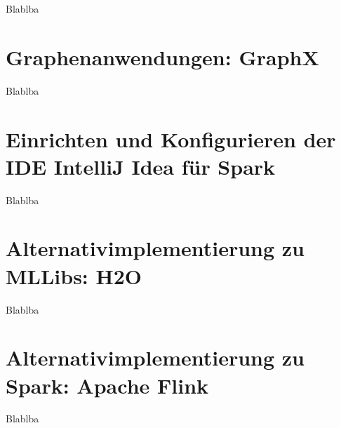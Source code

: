 Blablba



\section{Graphenanwendungen: GraphX}
\label{section:graphx}

Blablba

\section{Einrichten und Konfigurieren der IDE IntelliJ Idea für Spark}
\label{section:intellij}

Blablba

\section{Alternativimplementierung zu MLLibs: H2O}
\label{section:h2o}

Blablba

\section{Alternativimplementierung zu Spark: Apache Flink}
\label{section:h2o}

Blablba

